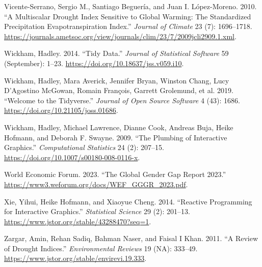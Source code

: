 \documentclass[
]{interact}
\newlength{\cslhangindent}
\newlength{\cslentryspacingunit} %
\newenvironment{CSLReferences}[2] %
 {%
  \setlength{\parindent}{0pt}
  \ifodd #1
  \let\oldpar\par
  \def\par{\hangindent=\cslhangindent\oldpar}
  \fi
  \setlength{\parskip}{#2\cslentryspacingunit}
 }%
 {}
\begin{document}
\begin{CSLReferences}{1}{0}
\leavevmode{}%
Vicente-Serrano, Sergio M., Santiago Beguería, and Juan I. López-Moreno.
2010. {``A {Multiscalar} {Drought} {Index} {Sensitive} to {Global}
{Warming}: {The} {Standardized} {Precipitation} {Evapotranspiration}
{Index}.''} \emph{Journal of Climate} 23 (7): 1696--1718.
\url{https://journals.ametsoc.org/view/journals/clim/23/7/2009jcli2909.1.xml}.

\leavevmode{}%
Wickham, Hadley. 2014. {``Tidy {Data}.''} \emph{Journal of Statistical
Software} 59 (September): 1--23.
\url{https://doi.org/10.18637/jss.v059.i10}.

\leavevmode{}%
Wickham, Hadley, Mara Averick, Jennifer Bryan, Winston Chang, Lucy
D'Agostino McGowan, Romain François, Garrett Grolemund, et al. 2019.
{``Welcome to the {Tidyverse}.''} \emph{Journal of Open Source Software}
4 (43): 1686. \url{https://doi.org/10.21105/joss.01686}.

\leavevmode{}%
Wickham, Hadley, Michael Lawrence, Dianne Cook, Andreas Buja, Heike
Hofmann, and Deborah F. Swayne. 2009. {``The Plumbing of Interactive
Graphics.''} \emph{Computational Statistics} 24 (2): 207--15.
\url{https://doi.org/10.1007/s00180-008-0116-x}.

\leavevmode{}%
World Economic Forum. 2023. {``{The Global Gender Gap Report 2023}.''}
\url{https://www3.weforum.org/docs/WEF_GGGR_2023.pdf}.

\leavevmode{}%
Xie, Yihui, Heike Hofmann, and Xiaoyue Cheng. 2014. {``Reactive
{Programming} for {Interactive} {Graphics}.''} \emph{Statistical
Science} 29 (2): 201--13.
\url{https://www.jstor.org/stable/43288470?seq=1}.

\leavevmode{}%
Zargar, Amin, Rehan Sadiq, Bahman Naser, and Faisal I Khan. 2011. {``A
Review of Drought Indices.''} \emph{Environmental Reviews} 19 (NA):
333--49. \url{https://www.jstor.org/stable/envirevi.19.333}.

\end{CSLReferences}
\end{document}

